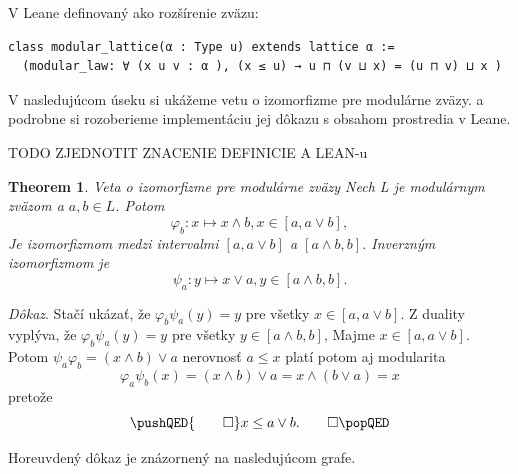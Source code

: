 \documentclass[a4paper,10pt,oneside]{report}%
\newtheorem{theorem}{Theorem}
\begin{document}
    V Leane definovaný ako rozšírenie zväzu:

\begin{lstlisting}
class modular_lattice(α : Type u) extends lattice α :=
  (modular_law: ∀ (x u v : α ), (x ≤ u) → u ⊓ (v ⊔ x) = (u ⊓ v) ⊔ x )
\end{lstlisting}

    V nasledujúcom úseku si ukážeme vetu o izomorfizme pre modulárne zväzy. a podrobne 
si rozoberieme implementáciu jej dôkazu s obsahom prostredia v Leane.

TODO ZJEDNOTIT ZNACENIE DEFINICIE A LEAN-u
\begin{theorem} \emph{Veta o izomorfizme pre modulárne zväzy}
Nech L je modulárnym zväzom a $a, b \in L$. Potom
    \begin{equation}
        \varphi_{b}: x \mapsto x \wedge b, x \in [a, a \vee b],
    \end{equation}
Je izomorfizmom medzi intervalmi $[a, a \vee b]$ a $[ a \wedge b, b]$.
Inverzným izomorfizmom je
    \begin{equation}
        \psi_{a}: y \mapsto x \vee a, y \in [a \wedge b, b].
    \end{equation}
\end{theorem}
\emph{Dôkaz}.  Stačí ukázať, že $\varphi_{b}\psi_{a}(y) = y$ pre všetky $x \in [a, a \vee b]$.
Z duality vyplýva, že $\varphi_{b}\psi_{a}(y) = y$ pre všetky
    $y \in [a \wedge b, b]$,
Majme $x \in [a, a \vee b]$. Potom
    $\psi_{a}\varphi_{b} = ( x \wedge b ) \vee a$ nerovnosť $a \leq x$ platí
    potom aj modularita
    \begin{equation}
        \varphi_{a}\psi_{b}(x) =
        ( x \wedge b ) \vee a =
        x \wedge ( b \vee a) =
        x
    \end{equation}
    pretože
    \[
        \pushQED{\qed}
        x \leq a \vee b. \qedhere
        \popQED
    \]

    Horeuvdený dôkaz je znázornený na nasledujúcom grafe.
\end{document}
